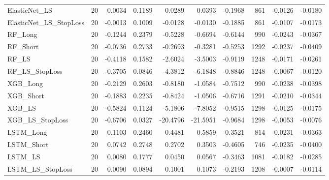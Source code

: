 \begin{tabular}{llrrrrrrrr}
\cline{1-10}
ElasticNet\_LS & 20 & 0.0034 & 0.1189 & 0.0289 & 0.0393 & -0.1968 & 861 & -0.0126 & -0.0180 \\
\cline{1-10}
ElasticNet\_LS\_StopLoss & 20 & -0.0013 & 0.1009 & -0.0128 & -0.0130 & -0.1885 & 861 & -0.0107 & -0.0173 \\
\cline{1-10}
RF\_Long & 20 & -0.1244 & 0.2379 & -0.5228 & -0.6694 & -0.6144 & 990 & -0.0243 & -0.0367 \\
\cline{1-10}
RF\_Short & 20 & -0.0736 & 0.2733 & -0.2693 & -0.3281 & -0.5253 & 1292 & -0.0237 & -0.0409 \\
\cline{1-10}
RF\_LS & 20 & -0.4118 & 0.1582 & -2.6024 & -3.5003 & -0.9119 & 1248 & -0.0171 & -0.0261 \\
\cline{1-10}
RF\_LS\_StopLoss & 20 & -0.3705 & 0.0846 & -4.3812 & -6.1848 & -0.8846 & 1248 & -0.0067 & -0.0120 \\
\cline{1-10}
XGB\_Long & 20 & -0.2129 & 0.2603 & -0.8180 & -1.0584 & -0.7512 & 990 & -0.0238 & -0.0398 \\
\cline{1-10}
XGB\_Short & 20 & -0.1883 & 0.2235 & -0.8424 & -1.0506 & -0.6716 & 1291 & -0.0210 & -0.0344 \\
\cline{1-10}
XGB\_LS & 20 & -0.5824 & 0.1124 & -5.1806 & -7.8052 & -0.9515 & 1298 & -0.0125 & -0.0175 \\
\cline{1-10}
XGB\_LS\_StopLoss & 20 & -0.6706 & 0.0327 & -20.4796 & -21.5951 & -0.9684 & 1298 & -0.0053 & -0.0076 \\
\cline{1-10}
LSTM\_Long & 20 & 0.1103 & 0.2460 & 0.4481 & 0.5859 & -0.3521 & 814 & -0.0231 & -0.0363 \\
\cline{1-10}
LSTM\_Short & 20 & 0.0742 & 0.2748 & 0.2702 & 0.3503 & -0.4605 & 746 & -0.0235 & -0.0400 \\
\cline{1-10}
LSTM\_LS & 20 & 0.0080 & 0.1777 & 0.0450 & 0.0567 & -0.3463 & 1081 & -0.0182 & -0.0285 \\
\cline{1-10}
LSTM\_LS\_StopLoss & 20 & 0.0090 & 0.0894 & 0.1001 & 0.1073 & -0.2193 & 1208 & -0.0007 & -0.0114 \\
\cline{1-10}
\bottomrule
\end{tabular}
